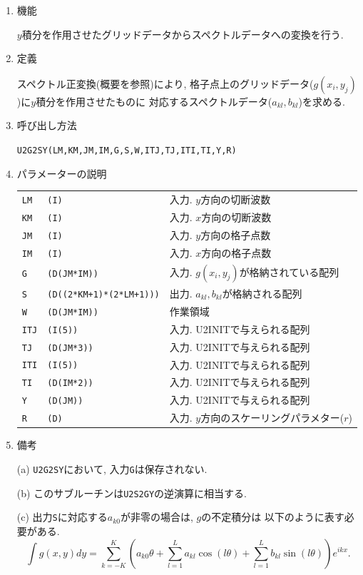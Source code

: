 \documentclass[a4j,fleqn]{jarticle}
\begin{document}
\begin{enumerate}

\item 機能 

$y$積分を作用させたグリッドデータからスペクトルデータへの変換を行う.

\item 定義

スペクトル正変換(概要を参照)により, 
格子点上のグリッドデータ($g(x_i,y_j)$)に$y$積分を作用させたものに
対応するスペクトルデータ($a_{kl},b_{kl}$)を求める.

\item 呼び出し方法 

{\tt U2G2SY(LM,KM,JM,IM,G,S,W,ITJ,TJ,ITI,TI,Y,R)}
  
\item パラメーターの説明

\begin{tabular}{lll}
{\tt LM} & {\tt (I)} & 入力. $y$方向の切断波数\\
{\tt KM} & {\tt (I)} & 入力. $x$方向の切断波数\\
{\tt JM} & {\tt (I)} & 入力. $y$方向の格子点数\\
{\tt IM} & {\tt (I)} & 入力. $x$方向の格子点数\\
{\tt G} & {\tt (D(JM*IM))} & 入力. $g(x_i,y_j)$が格納されている配列\\
{\tt S} & {\tt (D((2*KM+1)*(2*LM+1)))} & 出力. $a_{kl},b_{kl}$が格納される配列\\
{\tt W} & {\tt (D(JM*IM))} & 作業領域\\
{\tt ITJ} & {\tt (I(5))} & 入力. U2INITで与えられる配列\\
{\tt TJ} & {\tt (D(JM*3))} & 入力. U2INITで与えられる配列\\
{\tt ITI} & {\tt (I(5))} & 入力. U2INITで与えられる配列\\
{\tt TI} & {\tt (D(IM*2))} & 入力. U2INITで与えられる配列\\
{\tt Y} & {\tt (D(JM))} & 入力. U2INITで与えられる配列\\
{\tt R} & {\tt (D)} & 入力. $y$方向のスケーリングパラメター($r$)
\end{tabular}

\item 備考

(a) {\tt U2G2SY}において, 入力{\tt G}は保存されない.

(b) このサブルーチンは{\tt U2S2GY}の逆演算に相当する.

(c) 出力{\tt S}に対応する$a_{k0}$が非零の場合は, $g$の不定積分は
 以下のように表す必要がある.
\[
\int g(x,y) dy=\sum^K_{k=-K}\left(
a_{k0}\theta+\sum^L_{l=1}a_{kl}\cos(l\theta)
+\sum^L_{l=1}b_{kl}\sin(l\theta)\right)
e^{ikx}.
\]

\end{enumerate}
\end{document}
